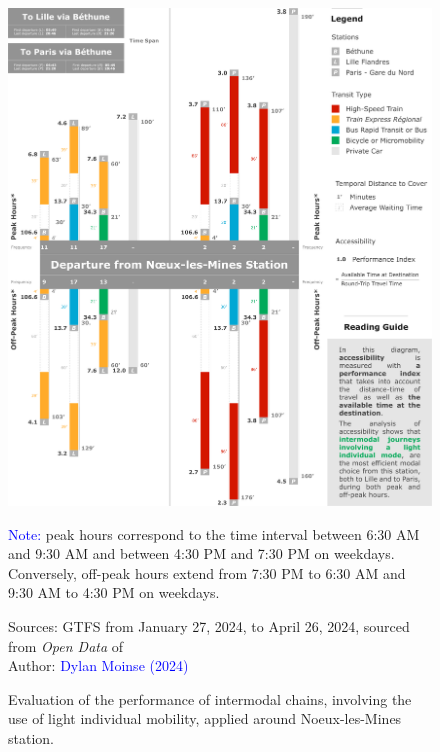 \begin{refsegment}
    \begin{figure}[h!]\vspace*{4pt}
        \caption{Evaluation of the performance of intermodal chains, involving the use of light individual mobility, applied around Noeux-les-Mines station.}
        \label{fig-chap5:performance-detours-noeux}
        \centerline{\includegraphics[width=1\columnwidth]{src/Figures/Chap-5/EN_Detours_Performance_Noeux_les_Mines.pdf}}
        \vspace{5pt}
        \begin{flushleft}\scriptsize{
        \textcolor{blue}{Note:} peak hours correspond to the time interval between 6:30 AM and 9:30 AM and between 4:30 PM and 7:30 PM on weekdays. Conversely, off-peak hours extend from 7:30 PM to 6:30 AM and 9:30 AM to 4:30 PM on weekdays.
        }\end{flushleft}
        \begin{flushright}\scriptsize{
        Sources: \acrshort{GTFS} from January 27, 2024, to April 26, 2024, sourced from \textsl{Open Data} of \textcolor{blue}{\textcite{sncf_sncf_2022}}
        \\
        Author: \textcolor{blue}{Dylan Moinse (2024)}
        }\end{flushright}
    \end{figure}
 

\end{refsegment}
